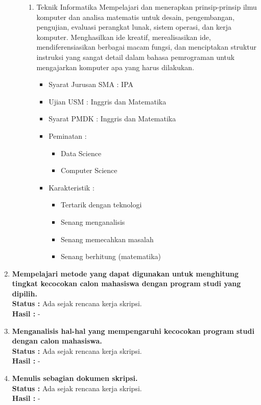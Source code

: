 \documentclass[a4paper,twoside]{article}
\begin{document}
\begin{enumerate}
\begin{enumerate}
\begin{enumerate}
				\item Teknik Informatika
					Mempelajari dan menerapkan prinsip-prinsip ilmu komputer dan analisa matematis untuk desain, pengembangan, pengujian, evaluasi perangkat lunak, sistem operasi, dan kerja komputer. Menghasilkan ide kreatif, merealisasikan ide, mendiferensiasikan berbagai macam fungsi, dan menciptakan struktur instruksi yang sangat detail dalam bahasa pemrograman untuk mengajarkan komputer apa yang harus dilakukan.
					\begin{itemize}
						\item Syarat Jurusan SMA : IPA
						\item Ujian USM : Inggris dan Matematika
						\item Syarat PMDK : Inggris dan Matematika
						\item Peminatan :
						\begin{itemize}
							\item Data Science
							\item Computer Science
						\end{itemize}
						\item Karakteristik :
						\begin{itemize}
							\item Tertarik dengan teknologi
							\item Senang menganalisis
							\item Senang memecahkan masalah
							\item Senang berhitung (matematika)
						\end{itemize}
					\end{itemize}
			\end{enumerate}
		\end{enumerate}

		\item \textbf{Mempelajari metode yang dapat digunakan untuk menghitung tingkat kecocokan calon mahasiswa dengan program studi yang dipilih.}\\
		{\bf Status :} Ada sejak rencana kerja skripsi.\\
		{\bf Hasil :} -

		\item \textbf{Menganalisis hal-hal yang mempengaruhi kecocokan program studi dengan calon mahasiswa.}\\
		{\bf Status :} Ada sejak rencana kerja skripsi.\\
		{\bf Hasil :} -
		
		\item \textbf{Menulis sebagian dokumen skripsi.}\\
		{\bf Status :} Ada sejak rencana kerja skripsi.\\
		{\bf Hasil :} -
	\end{enumerate}
\end{document}
